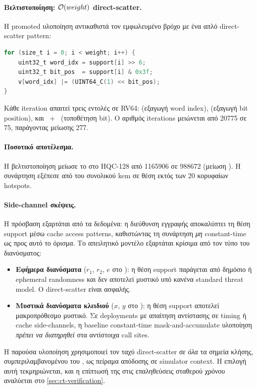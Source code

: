 \paragraph{Βελτιστοποίηση: $\mathcal{O}(weight)$ direct-scatter.}
Η promoted υλοποίηση αντικαθιστά τον εμφωλευμένο βρόχο με ένα απλό
direct-scatter pattern:

\begin{lstlisting}[language=C, basicstyle=\small\ttfamily]
for (size_t i = 0; i < weight; i++) {
    uint32_t word_idx = support[i] >> 6;
    uint32_t bit_pos  = support[i] & 0x3f;
    v[word_idx] |= (UINT64_C(1) << bit_pos);
}
\end{lstlisting}

Κάθε iteration απαιτεί τρεις εντολές σε RV64:  (εξαγωγή word
index),  (εξαγωγή bit position), και ~+~
(τοποθέτηση bit). Ο αριθμός iterations μειώνεται
από \num{20775} σε \num{75}, παράγοντας μείωσης \num{277}.

\paragraph{Ποσοτικό αποτέλεσμα.}
Η βελτιστοποίηση μείωσε το \Encaps \instret στο HQC-128 από \num{1165906}
σε \num{988672} (μείωση ). Η συνάρτηση εξέπεσε από 
του συνολικού \gls{kem} σε θέση εκτός των \num{20} κορυφαίων hotspots.

\ifTODO
\paragraph{Side-channel σκέψεις.}
Η πρόσβαση  εξαρτάται από τα δεδομένα: η
διεύθυνση εγγραφής αποκαλύπτει τη θέση support μέσω cache access
patterns, καθιστώντας τη συνάρτηση \emph{μη} constant-time ως προς
αυτό το όρισμα.
%
Το απειλητικό μοντέλο εξαρτάται κρίσιμα από τον τύπο του διανύσματος:
%
\begin{itemize}
  \item \textbf{Εφήμερα διανύσματα} ($r_1$, $r_2$, $e$ στο \Encaps):
        η θέση support παράγεται από δημόσιο ή ephemeral randomness και
        δεν αποτελεί μυστικό υπό κανένα standard threat model. Ο direct-scatter
        είναι ασφαλής.
  \item \textbf{Μυστικά διανύσματα κλειδιού} ($x$, $y$ στο \KeyGen):
        η θέση support αποτελεί μακροπρόθεσμο μυστικό. Σε deployments
        με απαίτηση αντίστασης σε timing ή cache side-channels, η
        baseline constant-time mask-and-accumulate υλοποίηση \emph{πρέπει
        να διατηρηθεί} στα αντίστοιχα call sites.
\end{itemize}
%
Η παρούσα υλοποίηση χρησιμοποιεί τον ταχύ direct-scatter \emph{σε όλα}
τα σημεία κλήσης, συμπεριλαμβανομένου του \KeyGen, ως πείραμα
απόδοσης σε simulator context. Η επιλογή αυτή τεκμηριώνεται, και η
επίπτωσή της στις επαληθεύσεις σταθερού χρόνου αναλύεται στο
\cref{sec:ct-verification}.
\fi


